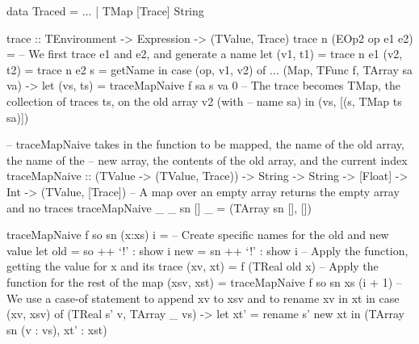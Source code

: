         \begin{haskell}[caption={Tracing map while keeping arrays, naïvely}, label=lst:trace_naive, gobble=12]
            data Traced
                = $\ldots$
                | TMap [Trace] String

            trace :: TEnvironment -> Expression -> (TValue, Trace)
            trace n (EOp2 op e1 e2) =
                -- We first trace e1 and e2, and generate a name
                let (v1, t1) = trace n e1
                    (v2, t2) = trace n e2
                    s = getName
                in  case (op, v1, v2) of
                    $\ldots$
                    (Map, TFunc f, TArray sa va) ->
                        let (vs, ts) = traceMapNaive f sa s va 0
                        -- The trace becomes TMap, the collection of traces ts, on the old array v2 (with  
                        -- name sa)
                        in  (vs, [(s, TMap ts sa)])

            -- traceMapNaive takes in the function to be mapped, the name of the old array, the name of the 
            -- new array, the contents of the old array, and the current index
            traceMapNaive :: (TValue -> (TValue, Trace)) -> String -> String -> [Float]
                -> Int -> (TValue, [Trace])
            -- A map over an empty array returns the empty array and no traces
            traceMapNaive _ _  sn []     _ = (TArray sn [], [])

            traceMapNaive f so sn (x:xs) i =
                -- Create specific names for the old and new value
                let old = so ++ `!' : show i
                    new = sn ++ `!' : show i
                    -- Apply the function, getting the value for x and its trace
                    (xv, xt) = f (TReal old x)
                    -- Apply the function for the rest of the map
                    (xsv, xst) = traceMapNaive f so sn xs (i + 1)
                    -- We use a case-of statement to append xv to xsv and to rename xv in xt
                in  case (xv, xsv) of
                    (TReal s' v, TArray _ vs) ->
                        let xt' = rename s' new xt
                        in  (TArray sn (v : vs), xt' : xst)
        \end{haskell}

